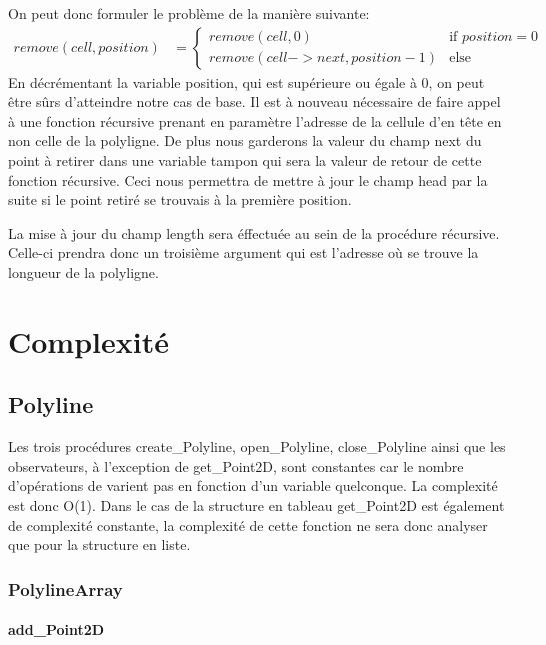 \documentclass[a4paper, 11pt, oneside]{article}
\begin{document}
On peut donc formuler le problème de la manière suivante:\\
$
\begin{array}{ll}
remove(cell, position) 
&=\left\{
    \begin{array}{ll}
        remove(cell, 0)& \mbox{if } position = 0 \\
        remove(cell->next, position - 1) & \mbox{else}
    \end{array}
\right.
\end{array}$ \\
En décrémentant la variable position, qui est supérieure ou égale à 0, on peut être sûrs d'atteindre notre cas de base. Il est à nouveau nécessaire de faire appel à une fonction récursive prenant en paramètre l'adresse de la cellule d'en tête en non celle de la polyligne. De plus nous garderons la valeur du champ next du point à retirer dans une variable tampon qui sera la valeur de retour de cette fonction récursive. Ceci nous permettra de mettre à jour le champ head par la suite si le point retiré se trouvais à la première position.

La mise à jour du champ length sera éffectuée au sein de la procédure récursive. Celle-ci prendra donc un troisième argument qui est l'adresse où se trouve la longueur de la polyligne.

\section{Complexité}

\subsection{Polyline}

Les trois procédures create\_Polyline, open\_Polyline, close\_Polyline ainsi que les observateurs, à l'exception de get\_Point2D, sont constantes car le nombre d'opérations de varient pas en fonction d'un variable quelconque. La complexité est donc O(1). Dans le cas de la structure en tableau get\_Point2D est également de complexité constante, la complexité de cette fonction ne sera donc analyser que pour la structure en liste.

\subsubsection{PolylineArray}
\paragraph{add\_Point2D}
\end{document}
